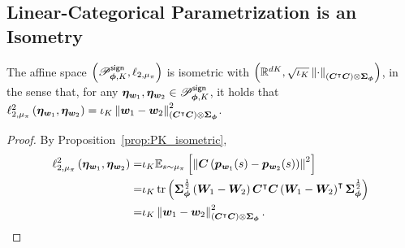 \subsection{Linear-Categorical Parametrization is an Isometry}\label{appendix:linear_cate_isometric}
\begin{proposition}\label{prop:linear_cate_isometric}
The affine space $\left({{\mathscr{P}}^{\mathsf{sign}}_{{\bm{\phi}},K}, \ell_{2,\mu_{\pi}}}\right)$ is isometric with  $\left({{\mathbb R}^{dK}, \sqrt{\iota_K}\left\|{\cdot}\right\|_{\left({{\bm{C}}^{\intercal}{\bm{C}}}\right)\otimes{\bm{\Sigma}}_{{\bm{\phi}}}}}\right)$, in the sense that, for any $\bm{\eta}_{{\bm{w}}_1},\bm{\eta}_{{\bm{w}}_2}\in{\mathscr{P}}^{\mathsf{sign}}_{{\bm{\phi}},K}$, it holds that $\ell_{2,\mu_{\pi}}^2\left({\bm{\eta}_{{\bm{w}}_1},\bm{\eta}_{{\bm{w}}_2}}\right)=\iota_K\left\|{{\bm{w}}_1-{\bm{w}}_2}\right\|^2_{\left({{\bm{C}}^{\intercal}{\bm{C}}}\right)\otimes{\bm{\Sigma}}_{{\bm{\phi}}}}$.
\end{proposition}
\begin{proof}
By Proposition~\ref{prop:PK_isometric},
\begin{equation*}
    \begin{aligned}
    \ell_{2,\mu_{\pi}}^2\left({\bm{\eta}_{{\bm{w}}_1},\bm{\eta}_{{\bm{w}}_2}}\right)=&\iota_K{\mathbb E}_{s\sim\mu_\pi}\left[{\left\|{{\bm{C}}\left({{\bm{p}}_{{\bm{w}}_1}(s)-{\bm{p}}_{{\bm{w}}_2}(s)}\right)}\right\|^2}\right]\\
    =&\iota_K\operatorname{tr}\left({{\bm{\Sigma}}_{{\bm{\phi}}}^{\frac{1}{2}}\left({{\bm{W}}_1-{\bm{W}}_2}\right){\bm{C}}^{\intercal}{\bm{C}}\left({{\bm{W}}_1-{\bm{W}}_2}\right)^{\intercal}{\bm{\Sigma}}_{{\bm{\phi}}}^{\frac{1}{2}}}\right) \\
    =&\iota_K\left\|{{\bm{w}}_1-{\bm{w}}_2}\right\|^2_{\left({{\bm{C}}^{\intercal}{\bm{C}}}\right)\otimes{\bm{\Sigma}}_{{\bm{\phi}}}}.
\end{aligned}
\end{equation*}
\end{proof}

